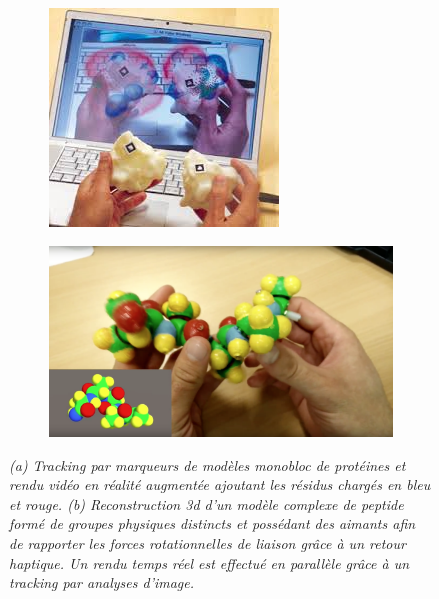\begin{figure}[h]
  \begin{subfigure}{.5\textwidth}
  \centering
  {\includegraphics[width=0.9\linewidth]{./figures/ch2/tangible_marker}}
    \caption{}
    \label{Fig:tangible_marker}
  \end{subfigure}
  \begin{subfigure}{.4\textwidth}
  \centering
  {\includegraphics[width=0.7\linewidth]{./figures/ch2/tangible_xav}}
    \caption{}
    \label{Fig:tangible_xav}
  \hspace{0.3cm}
  \end{subfigure}
  \caption{\it (a) Tracking par marqueurs de modèles monobloc de protéines et rendu vidéo en réalité augmentée ajoutant les résidus chargés en bleu et rouge.
  (b) Reconstruction 3d d'un modèle complexe de peptide formé de groupes physiques distincts et possédant des aimants afin de rapporter les forces rotationnelles de liaison grâce à un retour haptique. Un rendu temps réel est effectué en parallèle grâce à un tracking par analyses d'image. 
  }
\end{figure}



